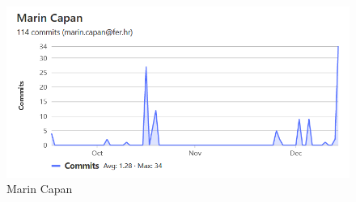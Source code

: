 		\begin{figure}[H]
				\includegraphics[width= 15 cm, height= 25 cm, keepaspectratio]{slike/MCapan.png} 
				\centering
				\caption{Marin Capan}
				\label{fig:MCapan}
		\end{figure}

		
		
	